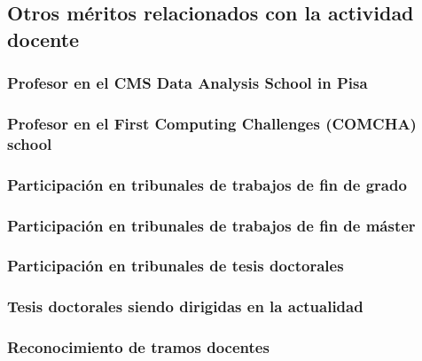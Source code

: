 \documentclass[a4paper, 11pt, twoside, openright]{report}
\begin{document}
\subsection{Otros méritos relacionados con la actividad docente}

\subsubsection{Profesor en el CMS Data Analysis School in Pisa}


\subsubsection{Profesor en el First Computing Challenges (COMCHA) school}


\subsubsection{Participación en tribunales de trabajos de fin de grado}


\subsubsection{Participación en tribunales de trabajos de fin de máster}


\subsubsection{Participación en tribunales de tesis doctorales}


\subsubsection{Tesis doctorales siendo dirigidas en la actualidad}


\subsubsection{Reconocimiento de tramos docentes}

\end{document}
